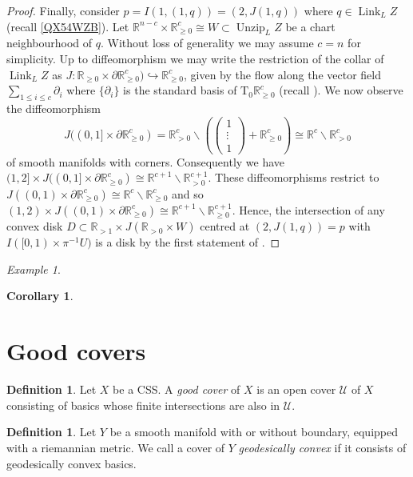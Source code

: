 \documentclass[11pt]{amsart}
\newcommand{\mcal}[1]{\mathcal{#1}}
\newcommand{\mbb}[1]{\mathbb{#1}}
\newcommand{\R}{\mbb{R}}
\newcommand{\Tangent}{\mathrm{T}}
\DeclareMathOperator{\Unzip}{Unzip}
\DeclareMathOperator{\Link}{Link}
\numberwithin{equation}{section}
\theoremstyle{definition}
\newtheorem{definition}[equation]{Definition}%
\theoremstyle{remark}
\newtheorem{example}[equation]{Example}
\theoremstyle{plain}
\newtheorem{corollary}[equation]{Corollary}
\begin{document}
\begin{proof}
    Finally, consider $p=I(1,(1,q))=(2,J(1,q))$ where $q\in\Link_LZ$ (recall \eqref{QX54WZB}). Let $\R^{n-c}\times\R^{c}_{\geq0}\cong W\subset\Unzip_LZ$ be a chart neighbourhood of $q$. Without loss of generality we may assume $c=n$ for simplicity. Up to diffeomorphism we may write the restriction of the collar of $\Link_LZ$ as $J\colon\R_{\geq0}\times\partial\R^c_{\geq0})\hookrightarrow \R^c_{\geq0}$, given by the flow along the vector field $\sum_{1\leq i\leq c}\partial_i$ where $\{\partial_i\}$ is the standard basis of $\Tangent_0\R^c_{\geq0}$ (recall ). We now observe the diffeomorphism 
    \[
        J((0,1]\times\partial \R^{c}_{\geq0})=\R^c_{>0}\smallsetminus\left(\begin{pmatrix}
        1 \\ \vdots \\ 1
        \end{pmatrix}
        +\R^c_{\geq0}\right)
        \cong\R^c\smallsetminus\R^c_{>0}
    \]
    of smooth manifolds with corners.
    Consequently we have $(1,2]\times J((0,1]\times\partial\R^c_{\geq0})\cong\R^{c+1}\smallsetminus\R^{c+1}_{>0}$. These diffeomorphisms restrict to $J((0,1)\times \partial\R^c_{\geq0})\cong\R^c\smallsetminus\R^c_{\geq0}$ and so $(1,2)\times J((0,1)\times\partial\R^c_{\geq0})\cong \R^{c+1}\smallsetminus\R^{c+1}_{\geq0}$. Hence, the intersection of any convex disk $D\subset\R_{>1}\times J(\R_{>0}\times W)$ centred at $(2,J(1,q))=p$ with $I([0,1)\times\pi^{-1}U)$ is a disk by the first statement of .
\end{proof}

\begin{example}
    
\end{example}

\begin{corollary}
    
\end{corollary}


\section{Good covers}

\begin{definition}
    Let $X$ be a CSS. A \emph{good cover} of $X$ is an open cover $\mcal{U}$ of $X$ consisting of basics whose finite intersections are also in $\mcal{U}$.
\end{definition}

\begin{definition}
    Let $Y$ be a smooth manifold with or without boundary, equipped with a riemannian metric. We call a cover of $Y$ \emph{geodesically convex} if it consists of geodesically convex basics.
\end{definition}
\end{document}
